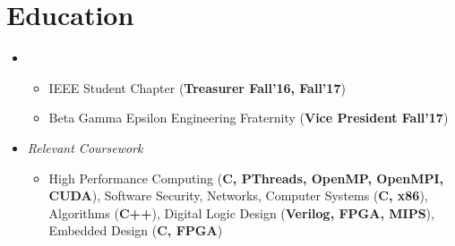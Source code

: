 \documentclass[11pt,letterpaper,sans]{moderncv}
\begin{document}
\makecvtitle

\vspace{-51pt}





\section{Education}
\vspace{1pt}


\begin{itemize}

\item[] {}
\vspace{-1mm}	\begin{itemize}
	 \item IEEE Student Chapter (\textbf{Treasurer Fall'16, Fall'17})
	 \item Beta Gamma Epsilon Engineering Fraternity (\textbf{Vice President Fall'17})
	\end{itemize}
	
\item[] {\textit{Relevant Coursework}}
\vspace{1pt} \begin{itemize}
               \item High Performance Computing (\textbf{C, PThreads, OpenMP, OpenMPI, CUDA}), 
               Software Security, 
               Networks,
               Computer Systems (\textbf{C, x86}),
               Algorithms (\textbf{C++}),
               Digital Logic Design 
               (\textbf{Verilog, FPGA, MIPS}), 
               Embedded Design (\textbf{C, FPGA})
              \end{itemize}


\end{itemize}
\vspace{-8pt}
\end{document}

